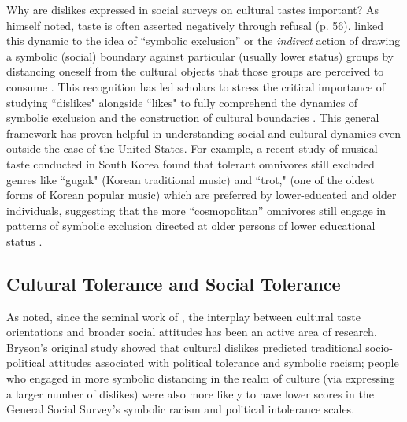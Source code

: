 \documentclass[12pt]{article}
\begin{document}
Why are dislikes expressed in social surveys on cultural tastes important? As \citet{bourdieu1984distinction-835} himself noted, taste is often asserted negatively through refusal (p. 56). \citet{bryson1996anything-311} linked this dynamic to the idea of ``symbolic exclusion'' or the \textit{indirect} action of drawing a symbolic (social) boundary against particular (usually lower status) groups by distancing oneself from the cultural objects that those groups are perceived to consume \citep{lizardo2016cultural-aaa}. This recognition has led scholars to stress the critical importance of studying ``dislikes" alongside ``likes" to fully comprehend the dynamics of symbolic exclusion and the construction of cultural boundaries \citep{lizardo2015musical-8c6, lindblom2022growing-ded, oncini2023cultural-323}. This general framework has proven helpful in understanding social and cultural dynamics even outside the case of the United States. For example, a recent study of musical taste conducted in South Korea found that tolerant omnivores still excluded genres like ``gugak" (Korean traditional music) and ``trot," (one of the oldest forms of Korean popular music) which are preferred by lower-educated and older individuals, suggesting that the more ``cosmopolitan'' omnivores still engage in patterns of symbolic exclusion directed at older persons of lower educational status \citep[321]{kim2020anything-71b}. 

\subsection*{Cultural Tolerance and Social Tolerance}

As noted, since the seminal work of \citet{bryson1996anything-311}, the interplay between cultural taste orientations and broader social attitudes has been an active area of research. Bryson's original study showed that cultural dislikes predicted traditional socio-political attitudes associated with political tolerance and symbolic racism; people who engaged in more symbolic distancing in the realm of culture (via expressing a larger number of dislikes) were also more likely to have lower scores in the General Social Survey's symbolic racism and political intolerance scales. 
\end{document}
